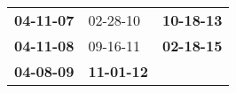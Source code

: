 \begin{supertabular}{p{0.33\columnwidth}p{0.33\columnwidth}p{0.33\columnwidth}}
 \textbf{04-11-07\textsuperscript{}} &           02-28-10\textsuperscript{} &  \textbf{10-18-13\textsuperscript{}} \\
 \textbf{04-11-08\textsuperscript{}} &           09-16-11\textsuperscript{} &  \textbf{02-18-15\textsuperscript{}} \\
 \textbf{04-08-09\textsuperscript{}} &  \textbf{11-01-12\textsuperscript{}} &                                      \\
\end{supertabular}
